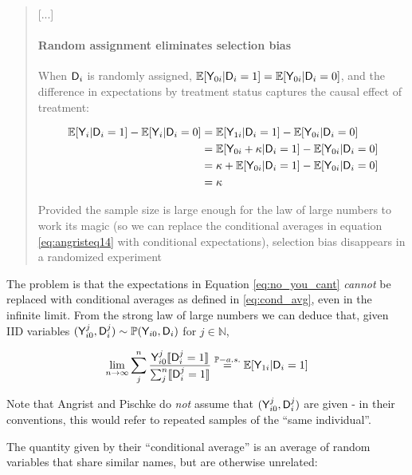 \begin{quote}
[...]

\paragraph{Random assignment eliminates selection bias} When $\mathsf{D}_i$ is randomly assigned, $\mathbb{E}[\mathsf{Y}_{0i}|\mathsf{D}_i = 1] = \mathbb{E}[\mathsf{Y}_{0i}|\mathsf{D}_i=0]$, and the difference in expectations by treatment status captures the causal effect of treatment:

\begin{align}
	\mathbb{E}[\mathsf{Y}_i|\mathsf{D}_i=1] - \mathbb{E}[\mathsf{Y}_i|\mathsf{D}_i=0] &= \mathbb{E}[\mathsf{Y}_{1i}|\mathsf{D}_i=1]-\mathbb{E}[\mathsf{Y}_{0i}|\mathsf{D}_i=0]\\
																	  &= \mathbb{E}[\mathsf{Y}_{0i}+\kappa|\mathsf{D}_i=1] - \mathbb{E}[\mathsf{Y}_{0i}|\mathsf{D}_i=0]\\
																	  &= \kappa + \mathbb{E}[\mathsf{Y}_{0i}|\mathsf{D}_i=1] - \mathbb{E}[\mathsf{Y}_{0i}|\mathsf{D}_i=0]\\
																	  &= \kappa \label{eq:no_you_cant}
\end{align}

Provided the sample size is large enough for the law of large numbers to work its magic (so we can replace the conditional averages in equation \ref{eq:angristeq14} with conditional expectations), selection bias disappears in a randomized experiment

\end{quote}

The problem is that the expectations in Equation \ref{eq:no_you_cant} \emph{cannot} be replaced with conditional averages as defined in \ref{eq:cond_avg}, even in the infinite limit. From the strong law of large numbers we can deduce that, given IID variables $(\mathsf{Y}^j_{i0},\mathsf{D}^j_i)\sim \mathbb{P}(\mathsf{Y}_{i0},\mathsf{D}_i)$ for $j\in \mathbb{N}$,

\begin{align}
	\lim_{n\to\infty}\sum_{j}^n\frac{\mathsf{Y}^j_{i0}\llbracket\mathsf{D}^j_i=1\rrbracket}{\sum_j^n\llbracket\mathsf{D}^j_i=1\rrbracket} \overset{\mathbb{P}-a.s.}{=} \mathbb{E}[\mathsf{Y}_{1i}|\mathsf{D}_i=1]
\end{align}

Note that Angrist and Pischke do \emph{not} assume that $(\mathsf{Y}^j_{i0},\mathsf{D}^j_i)$ are given - in their conventions, this would refer to repeated samples of the ``same individual''.

The quantity given by their ``conditional average'' is an average of random variables that share similar names, but are otherwise unrelated:


